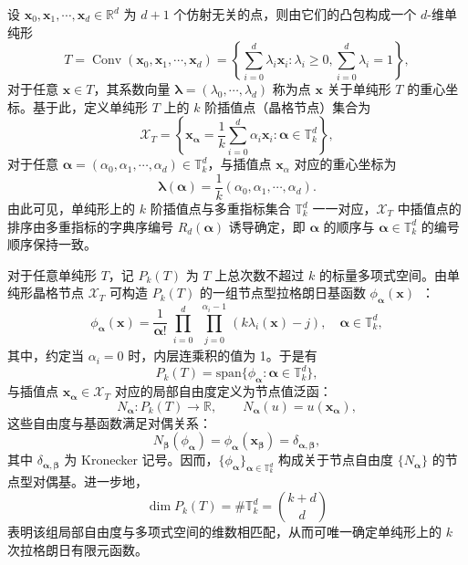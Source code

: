 设 $\boldsymbol{x}_0,\boldsymbol{x}_1,\cdots,\boldsymbol{x}_d\in\mathbb{R}^d$ 为 $d+1$ 个仿射无关的点，则由它们的凸包构成一个 $d$-维单纯形
\[
T = \operatorname{Conv}(\boldsymbol{x}_0,\boldsymbol{x}_1,\cdots,\boldsymbol{x}_d) = \left\{\sum_{i=0}^d\lambda_i\boldsymbol{x}_i:\lambda_i\geq0,\sum_{i=0}^d\lambda_i=1\right\},
\]
对于任意 $\boldsymbol{x}\in{T}$，其系数向量 $\boldsymbol{\lambda} = (\lambda_0,\cdots,\lambda_d)$ 称为点 $\boldsymbol{x}$ 关于单纯形 $T$ 的重心坐标。基于此，定义单纯形 $T$ 上的 $k$ 阶插值点（晶格节点）集合为
\[
\mathcal{X}_T = \left\{\boldsymbol{x}_{\boldsymbol{\alpha}} = \frac{1}{k}\sum_{i=0}^{d}\alpha_i\boldsymbol{x}_i:\boldsymbol{\alpha}\in\mathbb{T}_k^d\right\},
\]
对于任意 $\boldsymbol{\alpha} = (\alpha_0,\alpha_1,\cdots,\alpha_d)\in\mathbb{T}_k^d$，与插值点 $\boldsymbol{x}_{\alpha}$ 对应的重心坐标为
\[
\boldsymbol{\lambda}(\boldsymbol{\alpha}) = \frac{1}{k}(\alpha_0,\alpha_1,\cdots,\alpha_d).
\]
由此可见，单纯形上的 $k$ 阶插值点与多重指标集合 $\mathbb{T}_k^d$ 一一对应，$\mathcal{X}_T$ 中插值点的排序由多重指标的字典序编号 $R_d(\boldsymbol{\alpha})$ 诱导确定，即 $\boldsymbol{\alpha}$ 的顺序与 $\boldsymbol{\alpha}\in\mathbb{T}_k^d$ 的编号顺序保持一致。

对于任意单纯形 $T$，记 $P_k(T)$ 为 $T$ 上总次数不超过 $k$ 的标量多项式空间。由单纯形晶格节点 $\mathcal{X}_T$ 可构造 $P_k(T)$ 的一组节点型拉格朗日基函数 $\phi_{\boldsymbol\alpha}(\boldsymbol{x})$~\cite{nicolaidesClassFiniteElements1972, chenGeometricDecompositionEfficient2024b}：
\[
\phi_{\boldsymbol{\alpha}}(\boldsymbol{x}) = \frac{1}{\boldsymbol{\alpha}!}\prod_{\substack{i=0}}^d\prod_{\substack{j=0}}^{\alpha_i-1}(k\lambda_i(\boldsymbol{x}) - j),\quad\boldsymbol{\alpha}\in\mathbb{T}_k^d,
\]
其中，约定当 $\alpha_i=0$ 时，内层连乘积的值为 1。于是有
\[
P_k(T) = \text{span}\{\phi_{\boldsymbol{\alpha}}:\boldsymbol{\alpha}\in\mathbb{T}_k^d\},
\]
与插值点 $\boldsymbol{x}_{\boldsymbol{\alpha}}\in\mathcal{X}_T$ 对应的局部自由度定义为节点值泛函：
\[
N_{\boldsymbol{\alpha}} : P_k(T) \to \mathbb{R},\qquad N_{\boldsymbol{\alpha}}(u) = u(\boldsymbol{x}_{\boldsymbol{\alpha}}),
\]
这些自由度与基函数满足对偶关系：
\[
N_{\boldsymbol{\beta}}(\phi_{\boldsymbol{\alpha}}) = \phi_{\boldsymbol{\alpha}}(\boldsymbol{x}_{\boldsymbol{\beta}}) = \delta_{\boldsymbol{\alpha},\boldsymbol{\beta}},
\]
其中 $\delta_{\boldsymbol{\alpha},\boldsymbol{\beta}}$ 为 Kronecker 记号。因而，$\{\phi_{\boldsymbol{\alpha}}\}_{\boldsymbol{\alpha}\in\mathbb{T}_k^d}$ 构成关于节点自由度 $\{N_{\boldsymbol{\alpha}}\}$ 的节点型对偶基。进一步地，
\[
\dim P_k(T)=\#\mathbb{T}_k^d=\binom{k+d}{d}
\]
表明该组局部自由度与多项式空间的维数相匹配，从而可唯一确定单纯形上的 $k$ 次拉格朗日有限元函数。

